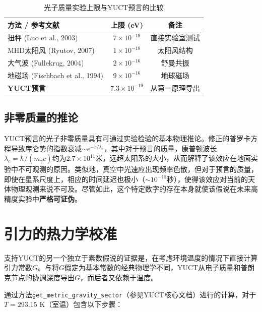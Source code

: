 \documentclass[11pt,a4paper]{article}
\begin{document}
	\begin{table}[h!]
		\centering
		\caption{光子质量实验上限与YUCT预言的比较}
		\label{tab:photon_limits}
		\small
		\begin{tabular}{lcc}
			\toprule
			\textbf{方法 / 参考文献} & \textbf{上限 (eV)} & \textbf{备注} \\
			\midrule
			扭秤 (Luo et al., 2003) & $7\times10^{-19}$ & 直接实验室测试 \\
			MHD太阳风 (Ryutov, 2007) & $1\times10^{-18}$ & 太阳风结构 \\
			大气波 (Fullekrug, 2004) & $2\times10^{-16}$ & 舒曼共振 \\
			地磁场 (Fischbach et al., 1994) & $9\times10^{-16}$ & 地球磁场 \\
			\midrule
			\textbf{YUCT预言} & \textbf{$7.3\times10^{-19}$} & 从第一原理导出 \\
			\bottomrule
		\end{tabular}
	\end{table}
	
	\subsection{非零质量的推论}
	YUCT预言的光子非零质量具有可通过实验检验的基本物理推论。修正的普罗卡方程\cite{Proca1936}导致库仑势的指数衰减$\sim e^{-r/\lambda_c}$，其中对于预言的质量，康普顿波长$\lambda_c = \hbar / (m_\gamma c)$约为$2.7 \times 10^{11}$米，远超太阳系的大小，从而解释了该效应在地面实验中不可观测的原因。类似地，真空中光速应出现频率色散，但对于预言的质量，即使在星系尺度上，相应的时间延迟也极小（$\sim 10^{-15}$秒），使得该效应对当前的天体物理观测来说不可及。尽管如此，这个特定数字的存在本身就使该假说在未来高精度实验中\textbf{严格可证伪}。
	
	\section{引力的热力学校准}
	\label{sec:thermal_gravity}
	
	支持YUCT的另一个独立于素数假说的证据是，在考虑环境温度的情况下直接计算引力常数$G$。与将$G$假定为基本常数的经典物理学不同，YUCT从电子质量和普朗克节点的协调深度导出$G$，而后者又依赖于温度。
	
	通过方法\texttt{get\_metric\_gravity\_sector}（参见YUCT核心文档）进行的计算，对于$T = 293.15$ K（室温）包含以下步骤：
	
\end{document}
